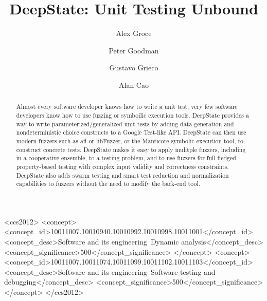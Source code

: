 \documentclass[sigconf]{acmart}
\begin{document}
\title{DeepState: Unit Testing Unbound}

\author{Alex Groce}
\author{Peter Goodman}
\author{Gustavo Grieco}
\author{Alan Cao}



\renewcommand{\shortauthors}{Groce, Goodman, Grieco, and Cao}

\begin{abstract}
Almost every software developer knows how to write a unit test; very few software developers know how to use fuzzing or symboilic execution tools.  DeepState provides a way to write parameterized/generalized unit tests by adding data generation and nondeterministic choice constructs to a Google Test-like API.  DeepState can then use modern fuzzers such as afl or libFuzzer, or the Manticore symbolic execution tool, to construct concrete tests.  DeepState makes it easy to apply mulitple fuzzers, including in a cooperative ensemble, to a testing problem, and to use fuzzers for full-fledged property-based testing with complex input validity and correctness constraints.  DeepState also adds swarm testing and smart test reduction and normalization capabilities to fuzzers without the need to modify the back-end tool.
\end{abstract}

\begin{CCSXML}
<ccs2012>
<concept>
<concept_id>10011007.10010940.10010992.10010998.10011001</concept_id>
<concept_desc>Software and its engineering~Dynamic analysis</concept_desc>
<concept_significance>500</concept_significance>
</concept>
<concept>
<concept_id>10011007.10011074.10011099.10011102.10011103</concept_id>
<concept_desc>Software and its engineering~Software testing and debugging</concept_desc>
<concept_significance>500</concept_significance>
</concept>
</ccs2012>
\end{CCSXML}
\end{document}
